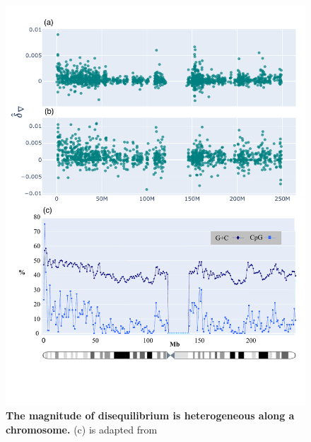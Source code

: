 \begin{figure}[htbp]
\centering
\includegraphics[width=\textwidth]{figures/plots/primate/nabla_CpG_appendix.pdf}
\caption{\textbf{The magnitude of disequilibrium is heterogeneous along a chromosome.} (c) is adapted from \cite{Gregory2006TheChromosome11}}
\label{fig:primate:dconv-manhattan-appendix}
\end{figure}
